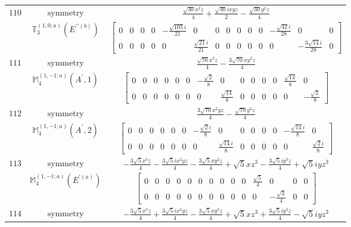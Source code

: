 \documentclass[fleqn,8pt,landscape]{jsarticle}
\begin{document}
\begin{longtable}{ccc}
$ 110 $ & $ \text{symmetry} $ & $ \frac{\sqrt{30} x^{2} z}{4} + \frac{\sqrt{30} i x y z}{2} - \frac{\sqrt{30} y^{2} z}{4} $ \\
$  $ & $ \mathbb{T}_{3}^{(1,0;a)}(E^{\prime\prime(b)}) $ & $ \begin{bmatrix} 0 & 0 & 0 & 0 & - \frac{\sqrt{105} i}{21} & 0 & 0 & 0 & 0 & 0 & 0 & - \frac{\sqrt{42} i}{28} & 0 & 0 \\ 0 & 0 & 0 & 0 & 0 & \frac{\sqrt{21} i}{21} & 0 & 0 & 0 & 0 & 0 & 0 & - \frac{3 \sqrt{14} i}{28} & 0 \end{bmatrix} $ \\ \hline
$ 111 $ & $ \text{symmetry} $ & $ \frac{\sqrt{70} x^{3} z}{4} - \frac{3 \sqrt{70} x y^{2} z}{4} $ \\
$  $ & $ \mathbb{M}_{4}^{(1,-1;a)}(A^{\prime},1) $ & $ \begin{bmatrix} 0 & 0 & 0 & 0 & 0 & 0 & - \frac{\sqrt{2}}{8} & 0 & 0 & 0 & 0 & 0 & \frac{\sqrt{14}}{8} & 0 \\ 0 & 0 & 0 & 0 & 0 & 0 & 0 & \frac{\sqrt{14}}{8} & 0 & 0 & 0 & 0 & 0 & - \frac{\sqrt{2}}{8} \end{bmatrix} $ \\ \hline
$ 112 $ & $ \text{symmetry} $ & $ \frac{3 \sqrt{70} x^{2} y z}{4} - \frac{\sqrt{70} y^{3} z}{4} $ \\
$  $ & $ \mathbb{M}_{4}^{(1,-1;a)}(A^{\prime},2) $ & $ \begin{bmatrix} 0 & 0 & 0 & 0 & 0 & 0 & - \frac{\sqrt{2} i}{8} & 0 & 0 & 0 & 0 & 0 & - \frac{\sqrt{14} i}{8} & 0 \\ 0 & 0 & 0 & 0 & 0 & 0 & 0 & \frac{\sqrt{14} i}{8} & 0 & 0 & 0 & 0 & 0 & \frac{\sqrt{2} i}{8} \end{bmatrix} $ \\ \hline
$ 113 $ & $ \text{symmetry} $ & $ - \frac{3 \sqrt{5} x^{3} z}{4} - \frac{3 \sqrt{5} i x^{2} y z}{4} - \frac{3 \sqrt{5} x y^{2} z}{4} + \sqrt{5} x z^{3} - \frac{3 \sqrt{5} i y^{3} z}{4} + \sqrt{5} i y z^{3} $ \\
$  $ & $ \mathbb{M}_{4}^{(1,-1;a)}(E^{\prime(a)}) $ & $ \begin{bmatrix} 0 & 0 & 0 & 0 & 0 & 0 & 0 & 0 & 0 & 0 & \frac{\sqrt{5}}{4} & 0 & 0 & 0 \\ 0 & 0 & 0 & 0 & 0 & 0 & 0 & 0 & 0 & 0 & 0 & - \frac{\sqrt{3}}{4} & 0 & 0 \end{bmatrix} $ \\ \hline
$ 114 $ & $ \text{symmetry} $ & $ - \frac{3 \sqrt{5} x^{3} z}{4} + \frac{3 \sqrt{5} i x^{2} y z}{4} - \frac{3 \sqrt{5} x y^{2} z}{4} + \sqrt{5} x z^{3} + \frac{3 \sqrt{5} i y^{3} z}{4} - \sqrt{5} i y z^{3} $ \\

\end{longtable}
\end{document}
